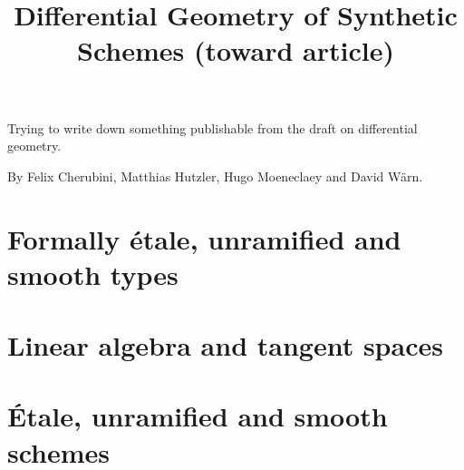 \documentclass{../util/zariski}
\title{Differential Geometry of Synthetic Schemes (toward article)}
\begin{document}
\maketitle

Trying to write down something publishable from the draft on differential geometry.

By Felix Cherubini, Matthias Hutzler, Hugo Moeneclaey and David Wärn.

\tableofcontents

\section{Formally étale, unramified and smooth types}


\section{Linear algebra and tangent spaces}


\section{Étale, unramified and smooth schemes}


\printindex

\printbibliography
\end{document}
